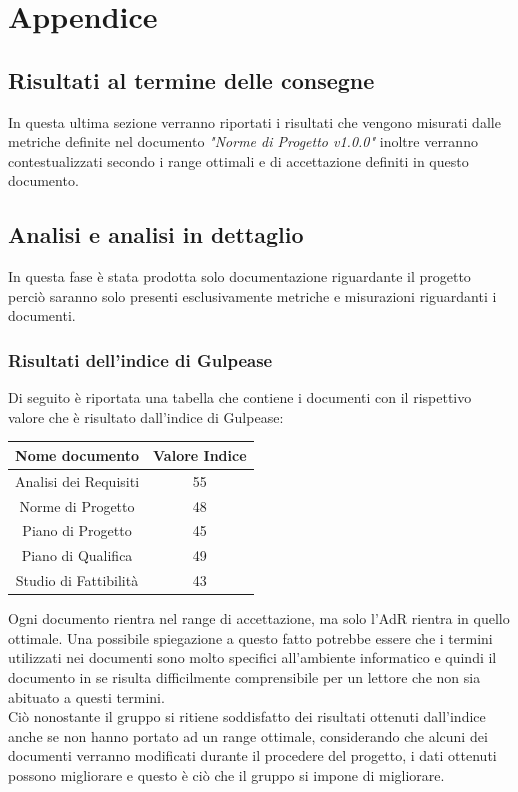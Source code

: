 \documentclass[12pt,a4paper,titlepage]{article}
\begin{document}
	\newpage
	\appendix
	\section{Appendice}
	\subsection{Risultati al termine delle consegne}
	In questa ultima sezione verranno riportati i risultati che vengono misurati dalle metriche definite nel documento \textit{"Norme di Progetto v1.0.0"} inoltre verranno contestualizzati secondo i range ottimali e di accettazione definiti in questo documento.\\
	
	\subsection{Analisi e analisi in dettaglio}
	
	In questa fase è stata prodotta solo documentazione riguardante il progetto perciò saranno solo presenti esclusivamente metriche e misurazioni riguardanti i documenti.\\
	
	\subsubsection{Risultati dell'indice di Gulpease}
	Di seguito è riportata una tabella che contiene i documenti con il rispettivo valore che è risultato dall'indice di Gulpease:
	\begin{tabular}{|c|c|}
    	{\textbf{Nome documento}}&{\textbf{Valore Indice}}\\
    	\hline
    	Analisi dei Requisiti & 55\\
    	\hline
    	Norme di Progetto & 48\\
    	\hline
    	Piano di Progetto & 45\\
    	\hline
    	Piano di Qualifica & 49\\
    	\hline
    	Studio di Fattibilità & 43\\
    \end{tabular}
    Ogni documento rientra nel range di accettazione, ma solo l'AdR rientra in quello ottimale. Una possibile spiegazione a questo fatto potrebbe essere che i termini utilizzati nei documenti sono molto specifici all'ambiente informatico e quindi il documento in se risulta difficilmente comprensibile 
    per un lettore che non sia abituato a questi termini.\\
    Ciò nonostante il gruppo si ritiene soddisfatto dei risultati ottenuti dall'indice anche se non hanno portato ad un range ottimale, considerando che alcuni dei documenti verranno modificati durante il procedere del progetto, i dati ottenuti possono migliorare e questo è ciò che il gruppo si impone di migliorare.\\
    
\end{document}
